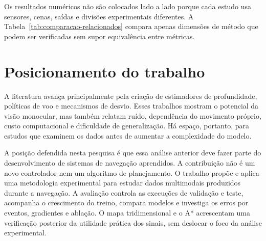 Os resultados numéricos não são colocados lado a lado porque cada estudo usa sensores, cenas, saídas e divisões experimentais diferentes. A Tabela~\ref{tab:comparacao-relacionados} compara apenas dimensões de método que podem ser verificadas sem supor equivalência entre métricas.

\begin{table}[htb]
\centering
\caption{Comparação qualitativa com linhas de trabalhos relacionados.}
\label{tab:comparacao-relacionados}
\end{table}

\section{Posicionamento do trabalho}

A literatura avança principalmente pela criação de estimadores de profundidade, políticas de voo e mecanismos de desvio. Esses trabalhos mostram o potencial da visão monocular, mas também relatam ruído, dependência do movimento próprio, custo computacional e dificuldade de generalização. Há espaço, portanto, para estudos que examinem os dados antes de aumentar a complexidade do modelo.

A posição defendida nesta pesquisa é que essa análise anterior deve fazer parte do desenvolvimento de sistemas de navegação aprendidos. A contribuição não é um novo controlador nem um algoritmo de planejamento. O trabalho propõe e aplica uma metodologia experimental para estudar dados multimodais produzidos durante a navegação. A avaliação controla as execuções de validação e teste, acompanha o crescimento do treino, compara modelos e investiga os erros por eventos, gradientes e ablação. O mapa tridimensional e o A* acrescentam uma verificação posterior da utilidade prática dos sinais, sem deslocar o foco da análise experimental.

